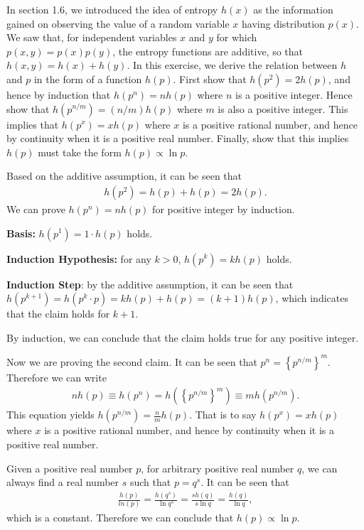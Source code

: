 \begin{question}{1.28}
	In section 1.6, we introduced the idea of entropy $h(x)$ as the information gained on observing the value of a random variable $x$ having distribution $p(x)$. We saw that, for independent variables $x$ and $y$ for which $p(x, y) = p(x)p(y)$, the entropy functions are additive, so that $h(x, y) = h(x) + h(y)$. In this exercise, we derive the relation between $h$ and $p$ in the form of a function $h(p)$. First show that $h(p^2) = 2h(p)$, and hence by induction that $h(p^n) = nh(p)$ where $n$ is a positive integer. Hence show that $h(p^{n / m}) = (n / m)h(p)$ where $m$ is also a positive integer. This implies that $h(p^x) = xh(p)$ where $x$ is a positive rational number, and hence by continuity when it is a positive real number. Finally, show that this implies $h(p)$ must take the form $h(p) \propto \ln p$.
\end{question}

\begin{answer}{}
	Based on the additive assumption, it can be seen that
	\begin{align}
		h(p^2) = h(p) + h(p) = 2h(p).
	\end{align}
	We can prove $h(p^n) = nh(p)$ for positive integer by induction.
	
	\noindent \textbf{Basis:} $h(p^1) = 1 \cdot h(p)$ holds.
	
	\noindent \textbf{Induction Hypothesis:} for any $k > 0$, $h(p^k) = kh(p)$ holds.
	
	\noindent \textbf{Induction Step}: by the additive assumption, it can be seen that $h(p^{k + 1}) = h(p^k \cdot p) = kh(p) + h(p) = (k+1)h(p)$, which indicates that the claim holds for $k + 1$. 
	
	\noindent By induction, we can conclude that the claim holds true for any positive integer.
	
	Now we are proving the second claim. It can be seen that $p^n = \left\{p^{n / m}\right\}^m$. Therefore we can write
	\begin{align}
		nh(p) \equiv h(p^n) = h\left(\left\{p^{n / m}\right\}^m\right) \equiv m h(p^{n / m}).
	\end{align}
	This equation yields $h(p^{n / m}) = \frac{n}{m} h(p)$. That is to say $h(p^x) = xh(p)$ where $x$ is a positive rational number, and hence by continuity when it is a positive real number.
	
	Given a positive real number $p$, for arbitrary positive real number $q$, we can always find a real number $s$ such that $p = q^s$. It can be seen that
	\begin{align}
		\frac{h(p)}{ln(p)} = \frac{h(q^s)}{\ln q^s} = \frac{s h(q)}{s \ln q} = \frac{h(q)}{\ln q},
	\end{align}
	which is a constant. Therefore we can conclude that $h(p) \propto \ln p$.
\end{answer}

